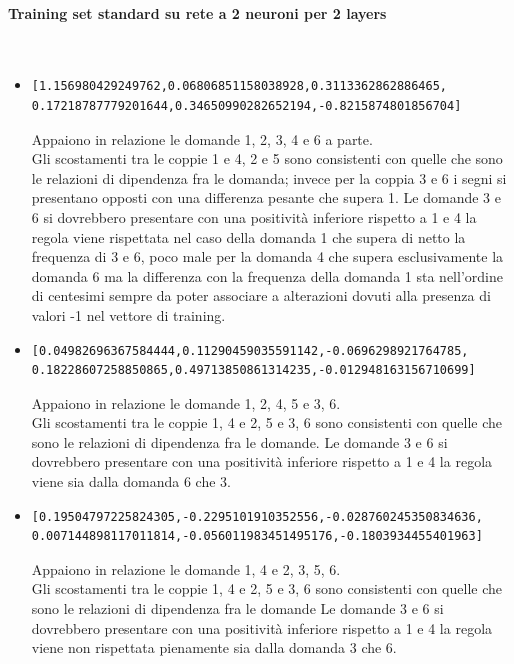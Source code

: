 \documentclass[11pt,a4paper,italian]{article}
\begin{document}
\paragraph{Training set standard su rete a 2 neuroni per 2 layers}\mbox{}
\label{Training set standard su rete a 2 neuroni}
\\
\noindent
\begin{itemize}
\item \begin{verbatim}[1.156980429249762,0.06806851158038928,0.3113362862886465,
0.17218787779201644,0.34650990282652194,-0.8215874801856704]\end{verbatim}
Appaiono in relazione le domande 1, 2, 3, 4  e 6 a parte.\\
Gli scostamenti tra le coppie  1 e 4, 2 e 5 sono consistenti con quelle che sono le relazioni di dipendenza fra le domanda; invece per la coppia 3 e 6 i segni si presentano opposti  con una differenza pesante che supera 1.
Le domande 3 e 6 si dovrebbero presentare con una positivit\`a inferiore rispetto a 1 e 4 la regola viene rispettata nel caso della domanda 1 che supera di netto la frequenza di 3 e 6, poco male per la domanda 4 che supera esclusivamente la domanda 6 ma la differenza con la frequenza della domanda 1 sta nell'ordine di centesimi sempre da poter associare a alterazioni dovuti alla presenza di valori -1 nel vettore di training.

\item \begin{verbatim}[0.04982696367584444,0.11290459035591142,-0.0696298921764785, 
0.18228607258850865,0.49713850861314235,-0.012948163156710699]\end{verbatim}
Appaiono in relazione le domande 1, 2, 4, 5 e 3, 6.\\
Gli scostamenti tra le coppie 1, 4 e 2, 5  e 3, 6 sono consistenti con quelle che sono le relazioni di dipendenza fra le domande.
Le domande 3 e 6 si dovrebbero presentare con una positivit\`a inferiore rispetto a 1 e 4 la regola viene sia dalla domanda 6 che 3.

\item \begin{verbatim}[0.19504797225824305,-0.2295101910352556,-0.028760245350834636,
0.007144898117011814,-0.056011983451495176,-0.1803934455401963]\end{verbatim}
Appaiono in relazione le domande 1, 4 e 2, 3, 5, 6.\\
Gli scostamenti tra le coppie 1, 4 e 2, 5 e 3, 6 sono consistenti con quelle che sono le relazioni di dipendenza fra le domande
Le domande 3 e 6 si dovrebbero presentare con una positivit\`a inferiore rispetto a 1 e 4 la regola viene non rispettata pienamente sia dalla domanda 3 che 6.


\end{itemize}
\end{document}
